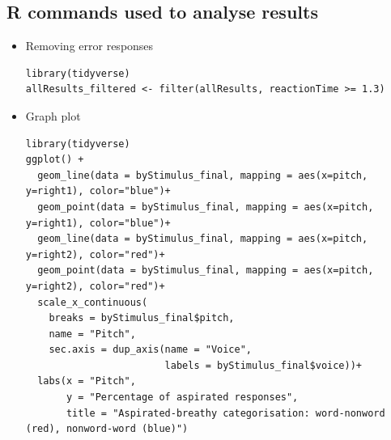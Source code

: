 \documentclass[12pt, english]{article}
\begin{document}
\begin{table}[h]
\caption{}
\label{tab:my-table}
\end{table}

\subsection{R commands used to analyse results}
\begin{itemize}
    \item Removing error responses
    \begin{lstlisting}[xleftmargin=0pt]
library(tidyverse)
allResults_filtered <- filter(allResults, reactionTime >= 1.3)
    \end{lstlisting} \vspace{10pt}
    \item Graph plot
    \begin{lstlisting}[xleftmargin=0pt]
library(tidyverse)
ggplot() + 
  geom_line(data = byStimulus_final, mapping = aes(x=pitch, y=right1), color="blue")+
  geom_point(data = byStimulus_final, mapping = aes(x=pitch, y=right1), color="blue")+
  geom_line(data = byStimulus_final, mapping = aes(x=pitch, y=right2), color="red")+
  geom_point(data = byStimulus_final, mapping = aes(x=pitch, y=right2), color="red")+
  scale_x_continuous(
    breaks = byStimulus_final$pitch,
    name = "Pitch",
    sec.axis = dup_axis(name = "Voice",
                        labels = byStimulus_final$voice))+
  labs(x = "Pitch", 
       y = "Percentage of aspirated responses", 
       title = "Aspirated-breathy categorisation: word-nonword (red), nonword-word (blue)")
    \end{lstlisting}
\end{itemize}

\end{document}

